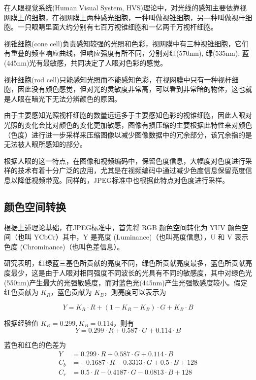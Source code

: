 在人眼视觉系统(Human Visual System, HVS)理论\cite{HVS}中，对光线的感知主要依靠视网膜上的细胞，在视网膜上两种感光细胞，一种叫做视锥细胞，另—种叫做视杆细胞。一只眼睛里面大约分别有七百万视锥细胞和一亿两千万视杆细胞。

视锥细胞(cone cell)负责感知较强的光照和色彩，视网膜中有三种视锥细胞，它们有重叠的频率响应曲线，但响应强度有所不同，分别对红(570nm), 绿(535nm), 蓝(445nm)光有最敏感，共同决定了人眼对色彩的感觉。

视杆细胞(rod cell)只能感知光照而不能感知色彩，在视网膜中只有一种视杆细胞，因此没有颜色感觉，但对光的灵敏度非常高，可以看到非常暗的物体，这也就是人眼在暗光下无法分辨颜色的原因。

由于主要感知光照视杆细胞的数量远远多于主要感知色彩的视锥细胞，因此人眼对光照的变化会比对颜色的变化更加敏感，图像有损压缩的主要根据此特性来对颜色（色度）进行进一步采样来压缩图像以减少图像数据中的冗余部分，该冗余指的是无法被人眼所感知的部分。

根据人眼的这一特点，在图像和视频编码中，保留色度信息，大幅度对色度进行采样的技术有着十分广泛的应用，尤其是在视频编码中通过减少色度信息保留亮度信息以降低视频带宽。同样的，JPEG标准中也根据此特点对色度进行采样。

\subsection{颜色空间转换}
根据上述理论基础，在JPEG标准中，首先将 RGB 颜色空间转化为 YUV 颜色空间（也叫 YCbCr）其中，Y 是亮度 (Luminance)（也叫亮度信息），U 和 V 表示色度 (Chrominance)（也叫色差信息）。

研究表明，红绿蓝三基色所贡献的亮度不同，绿色所贡献亮度最多，蓝色所贡献亮度最少，这是由于人眼对相同强度不同波长的光具有不同的敏感度，其中对绿色光(550nm)产生最大的光强敏感度，而对蓝色光(445nm)产生光强敏感度较小。假定红色贡献为 $K_R$，蓝色贡献为 $K_B$，则亮度可以表示为

\begin{equation}
    Y = K_R \cdot R + (1-K_R-K_B) \cdot G + K_B \cdot B
    \label{Eq.yuv}
\end{equation}

根据经验值 $K_R=0.299, K_B=0.114$，则有
\begin{equation}
    Y = 0.299 \cdot R + 0.587 \cdot G + 0.114 \cdot B
\end{equation}

蓝色和红色的色差为
\begin{equation}
    \begin{aligned}
        Y   &= 0.299   \cdot R + 0.587    \cdot G + 0.114 \cdot B \\
        C_b &= -0.1687 \cdot R - 0.3313   \cdot G + 0.5 \cdot B +128\\
        C_r &= 0.5   \cdot R - 0.4187   \cdot G - 0.0813 \cdot B +128\\
    \end{aligned}    
\end{equation}

